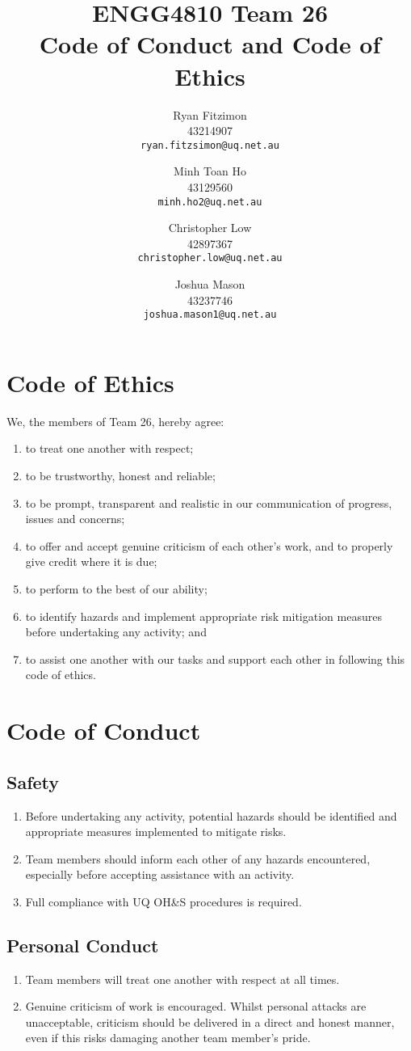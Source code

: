 \documentclass[a4paper]{article}
\title{ENGG4810 Team 26\\
	Code of Conduct and Code of Ethics}
\author{Ryan Fitzimon\\
	43214907\\
	\texttt{ryan.fitzsimon@uq.net.au}
	\and
	Minh Toan Ho\\
	43129560\\
	\texttt{minh.ho2@uq.net.au}
	\and
	Christopher Low\\
	42897367\\
	\texttt{christopher.low@uq.net.au}
	\and
	Joshua Mason\\
	43237746\\
	\texttt{joshua.mason1@uq.net.au}
}
\begin{document}
\maketitle

\section{Code of Ethics}
We, the members of Team 26, hereby agree:
\begin{enumerate}
	\item to treat one another with respect;
	\item to be trustworthy, honest and reliable;
	\item to be prompt, transparent and realistic in our communication of progress, issues and concerns;
	\item to offer and accept genuine criticism of each other's work, and to properly give credit where it is due;
	\item to perform to the best of our ability;
	\item to identify hazards and implement appropriate risk mitigation measures before undertaking any activity; and
	\item to assist one another with our tasks and support each other in following this code of ethics.
\end{enumerate}

\pagebreak
\section{Code of Conduct}

\subsection{Safety}
\begin{enumerate}[label=(\alph*)]
	\item Before undertaking any activity, potential hazards should be identified and appropriate measures implemented to mitigate risks.
	\item Team members should inform each other of any hazards encountered, especially before accepting assistance with an activity.
	\item Full compliance with UQ OH\&S procedures is required.
\end{enumerate}

\subsection{Personal Conduct}
\begin{enumerate}[label=(\alph*)]
	\item Team members will treat one another with respect at all times.
	\item Genuine criticism of work is encouraged. Whilst personal attacks are unacceptable, criticism should be delivered in a direct and honest manner, even if this risks damaging another team member's pride.
	
\end{enumerate}
\end{document}
